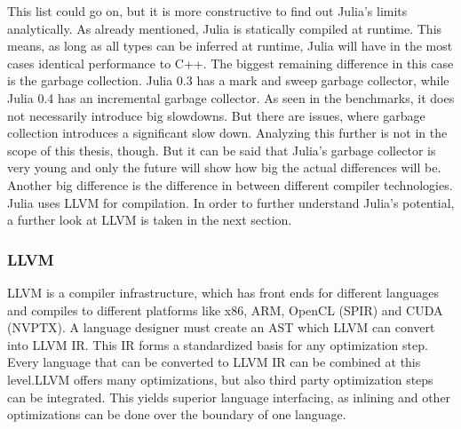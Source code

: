 This list could go on, but it is more constructive to find out Julia's limits analytically.
As already mentioned, Julia is statically compiled at runtime. This means, as long as all types can be inferred at runtime, Julia will have in the most cases identical performance to C++.
The biggest remaining difference in this case is the garbage collection. Julia 0.3 has a mark and sweep garbage collector, while Julia 0.4 has an incremental garbage collector.
As seen in the benchmarks, it does not necessarily introduce big slowdowns.
But there are issues, where garbage collection introduces a significant slow down\cite{ReadDlmGC}.
Analyzing this further is not in the scope of this thesis, though. 
But it can be said that Julia's garbage collector is very young and only the future will show how big the actual differences will be.
Another big difference is the difference in between different compiler technologies.
Julia uses \ac{LLVM} for compilation.
In order to further understand Julia's potential, a further look at LLVM is taken in the next section.

\subsubsection{\ac{LLVM}}

\ac{LLVM} is a compiler infrastructure, which has front ends for different languages and compiles to different platforms like x86, ARM, \ac{OpenCL} (SPIR) and \ac{CUDA} (NVPTX). 
A language designer must create an \ac{AST} which \ac{LLVM} can convert into \ac{LLVM} \ac{IR}. This \ac{IR} forms a standardized basis for any optimization step. Every language that can be converted to \ac{LLVM} \ac{IR} can be combined at this level.\ac{LLVM} offers many optimizations, but also third party optimization steps can be integrated.
This yields superior language interfacing, as inlining and other optimizations can be done over the boundary of one language.

